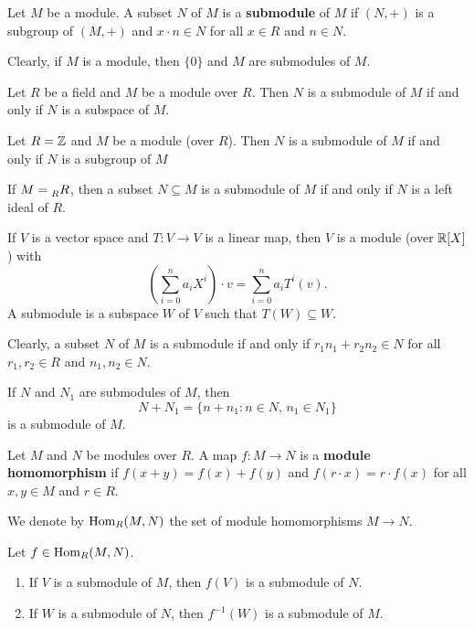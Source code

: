 \begin{definition}
	Let $M$ be a module. A subset $N$ of $M$ is a \textbf{submodule} of $M$ if 
	$(N,+)$ is a subgroup of $(M,+)$ and 
	$x\cdot n\in N$ for all $x\in R$ and $n\in N$. 
\end{definition}

Clearly, if $M$ is a module, then $\{0\}$ and $M$ are submodules of $M$. 

\begin{example}
Let $R$ be a field and $M$ be a module over $R$. Then
$N$ is a submodule of $M$ if and only if $N$ is a subspace of $M$. 
\end{example}

\begin{example}
Let $R=\mathbb{Z}$ and $M$ be a module (over $R$). Then
$N$ is a submodule of $M$ if and only if $N$ is a subgroup of $M$
\end{example}

\begin{example}
If $M=\prescript{}{R}R$, then a subset $N\subseteq M$ is a submodule
of $M$ if and only if $N$ is a left ideal of $R$. 
\end{example}

\begin{example}
If $V$ is a vector space and $T\colon V\to V$ is a linear map, then
$V$ is a module (over $\mathbb{R}[X]$) with  
\[
\left(\sum_{i=0}^na_iX^i\right)\cdot v=\sum_{i=0}^na_iT^i(v).
\]
A submodule is a subspace $W$ 
of $V$ such that $T(W)\subseteq W$. 
\end{example}

Clearly, a subset $N$ of $M$ is a submodule if and only 
if $r_1n_1+r_2n_2\in N$ for all
$r_1,r_2\in R$ and $n_1,n_2\in N$. 	

\begin{exercise}
If $N$ and $N_1$ are submodules of $M$, then 
\[
N+N_1=\{n+n_1:n\in N,\,n_1\in N_1\}
\]
is a submodule of $M$.
\end{exercise}

\begin{definition}
Let $M$ and $N$ be modules over $R$. 
A map $f\colon M\to N$ is a \textbf{module homomorphism} if $f(x+y)=f(x)+f(y)$ and 
$f(r\cdot x)=r\cdot f(x)$ for all $x,y\in M$ and $r\in R$. 
\end{definition}

We denote by $\operatorname{Hom}_R(M,N)$ the set of module homomorphisms $M\to N$. 

\begin{exercise}
Let $f\in\operatorname{Hom}_R(M,N)$.  
\begin{enumerate}
\item If $V$ is a submodule of $M$, then $f(V)$ is a submodule of $N$.
\item If $W$ is a submodule of $N$, then $f^{-1}(W)$ is a submodule of $M$.
\end{enumerate}
\end{exercise}

